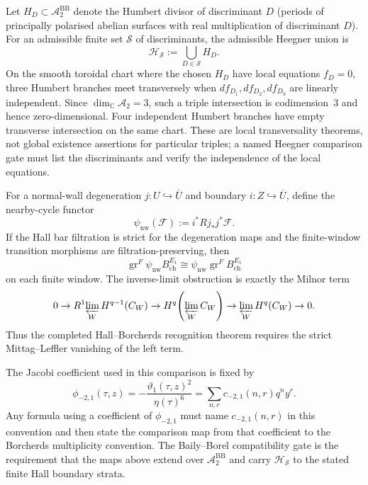 \begin{proposition}
Let $H_D\subset\mathcal A_2^{\mathrm{BB}}$ denote the Humbert divisor
of discriminant $D$ \textup{(}periods of principally polarised
abelian surfaces with real multiplication of discriminant $D$\textup{)}.
For an admissible finite set $\mathcal S$ of discriminants, the
admissible Heegner union is
\begin{equation}
\label{eq:hgf-admissible-heegner-union}
\mathcal H_{\mathcal S}:=\bigcup_{D\in\mathcal S}H_D.
\end{equation}
On the smooth toroidal chart where the chosen $H_D$ have local
equations $f_D=0$, three Humbert branches meet transversely when
$df_{D_1},df_{D_2},df_{D_3}$ are linearly independent.  Since
$\dim_\mathbb C\mathcal A_2=3$, such a triple intersection is
codimension~$3$ and hence zero-dimensional.  Four independent Humbert
branches have empty transverse intersection on the same chart.  These
are local transversality theorems, not global existence assertions for
particular triples; a named Heegner comparison gate must list the
discriminants and verify the independence of the local equations.

For a normal-wall degeneration
$j\colon U\hookrightarrow\overline U$ and boundary
$i\colon Z\hookrightarrow\overline U$, define the nearby-cycle functor
\begin{equation}
\label{eq:hgf-nearby-cycle-functor}
\psi_{\mathrm{nw}}(\mathcal F):=i^*Rj_*j^*\mathcal F.
\end{equation}
If the Hall bar filtration is strict for the degeneration maps and
the finite-window transition morphisms are filtration-preserving, then
\begin{equation}
\label{eq:hgf-nearby-cycle-bar-filtration}
\operatorname{gr}^F\psi_{\mathrm{nw}} B_{\mathrm{ch}}^{E_1}
\cong
\psi_{\mathrm{nw}}\operatorname{gr}^F B_{\mathrm{ch}}^{E_1}
\end{equation}
on each finite window.  The inverse-limit obstruction is exactly the
Milnor term
\begin{equation}
\label{eq:hgf-lim-one-obstruction}
0\to R^1\!\varprojlim_W H^{q-1}(C_W)
\to H^q\!\left(\varprojlim_W C_W\right)
\to \varprojlim_W H^q(C_W)\to0.
\end{equation}
Thus the completed Hall--Borcherds recognition theorem requires the
strict Mittag--Leffler vanishing of the left term.

The Jacobi coefficient used in this comparison is fixed by
\begin{equation}
\label{eq:hgf-phi-minus-two-one-coefficient}
\phi_{-2,1}(\tau,z)=
-\frac{\vartheta_1(\tau,z)^2}{\eta(\tau)^6}
=\sum_{n,r}c_{-2,1}(n,r)q^n y^r.
\end{equation}
Any formula using a coefficient of $\phi_{-2,1}$ must name
$c_{-2,1}(n,r)$ in this convention and then state the comparison map
from that coefficient to the Borcherds multiplicity convention.  The
Baily--Borel compatibility gate is the requirement that the maps above
extend over $\mathcal A_2^{\mathrm{BB}}$ and carry
$\mathcal H_{\mathcal S}$ to the stated finite Hall boundary strata.


\end{proposition}
